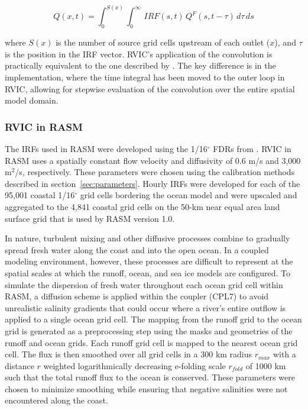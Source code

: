 \documentclass[jgrga, draft]{agutex}
\begin{document}
\begin{article}
\begin{equation}
  \label{eq:convolution}
   Q(x,t) = \int_0^{S(x)} \int_0^{\infty}\,IRF(s,t)\,Q^F(s,t-\tau)\,d\tau\,ds
 \end{equation}

where $S(x)$ is the number of source grid cells upstream of each outlet ($x$), and $\tau$ is the position in the IRF vector.
RVIC's application of the convolution is practically equivalent to the one described by \citet{Lohmann_1996}.
The key difference is in the implementation, where the time integral has been moved to the outer loop in RVIC, allowing for stepwise evaluation of the convolution over the entire spatial model domain.

\subsubsection{RVIC in RASM}

The IRFs used in RASM were developed using the 1/16$^{\circ}$ FDRs from \citet{Wu_2011}.
RVIC in RASM uses a spatially constant flow velocity and diffusivity of 0.6 m/s and 3,000 m$^2$/s, respectively.
These parameters were chosen using the calibration methods described in section~\ref{sec:parameters}.
Hourly IRFs were developed for each of the 95,001 coastal 1/16$^{\circ}$ grid cells bordering the ocean model and were upscaled and aggregated to the 4,841 coastal grid cells on the 50-km near equal area land surface grid that is used by RASM version 1.0.

In nature, turbulent mixing and other diffusive processes combine to gradually spread fresh water along the coast and into the open ocean.
In a coupled modeling environment, however, these processes are difficult to represent at the spatial scales at which the runoff, ocean, and sea ice models are configured.
To simulate the dispersion of fresh water throughout each ocean grid cell within RASM, a diffusion scheme is applied within the coupler (CPL7) to avoid unrealistic salinity gradients that could occur where a river's entire outflow is applied to a single ocean grid cell.
The mapping from the runoff grid to the ocean grid is generated as a preprocessing step using the masks and geometries of the runoff and ocean grids.
Each runoff grid cell is mapped to the nearest ocean grid cell.
The flux is then smoothed over all grid cells in a 300 km radius $r_{max}$ with a distance $r$ weighted logarithmically decreasing e-folding scale $r_{fold}$ of 1000 km such that the total runoff flux to the ocean is conserved.
These parameters were chosen to minimize smoothing while ensuring that negative salinities were not encountered along the coast.


\end{article}
\end{document}

